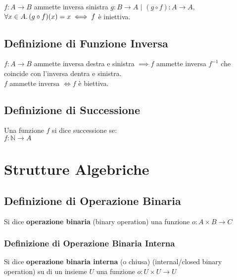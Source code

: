 \documentclass[a4paper, twoside, italian, 11pt]{book}
\newcommand{\N}{\mathbb N}
\begin{document}
$f : A \rightarrow B$ ammette inversa sinistra $g : B \rightarrow A$ $|$ $(g \circ f) : A \rightarrow A,$ $\forall x \in A \ldotp (g \circ f)(x) = x \iff f$ è iniettiva.



\section{Definizione di Funzione Inversa}

$f : A \rightarrow B$ ammette inversa destra e sinistra $\implies f$ ammette inversa $f^{-1}$ che coincide con l'inversa dentra e sinistra. \\

\noindent
$f$ ammette inversa $\iff f$ è biettiva.





\section{Definizione di Successione}

Una funzione $f$ si dice successione se: \\

$f : \N \rightarrow A$



\chapter{Strutture Algebriche}



\section{Definizione di Operazione Binaria}

Si dice \textbf{operazione binaria} (binary operation) una funzione $o : A \times B \rightarrow C$


\subsection{Definizione di Operazione Binaria Interna}

Si dice \textbf{operazione binaria interna} (o chiusa) (internal/closed binary operation) su di un insieme $U$ una funzione $o : U \times U \rightarrow U$
\end{document}
